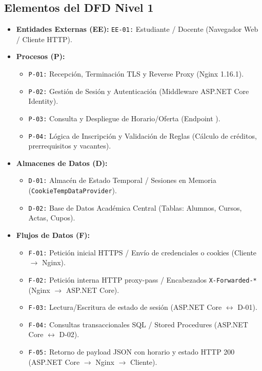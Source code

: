 \subsection{Elementos del DFD Nivel 1}
\begin{itemize}[itemsep=1.5pt,topsep=1pt,parsep=0pt]
    \item \textbf{Entidades Externas (EE):} \texttt{EE-01:} Estudiante / Docente (Navegador Web / Cliente HTTP).
    \item \textbf{Procesos (P):}
    \begin{itemize}[itemsep=0.8pt,topsep=0.5pt,parsep=0pt]
        \item \texttt{P-01:} Recepción, Terminación TLS y Reverse Proxy (Nginx 1.16.1).
        \item \texttt{P-02:} Gestión de Sesión y Autenticación (Middleware ASP.NET Core Identity).
        \item \texttt{P-03:} Consulta y Despliegue de Horario/Oferta (Endpoint ).
        \item \texttt{P-04:} Lógica de Inscripción y Validación de Reglas (Cálculo de créditos, prerrequisitos y vacantes).
    \end{itemize}
    \item \textbf{Almacenes de Datos (D):}
    \begin{itemize}[itemsep=0.8pt,topsep=0.5pt,parsep=0pt]
        \item \texttt{D-01:} Almacén de Estado Temporal / Sesiones en Memoria (\texttt{CookieTempDataProvider}).
        \item \texttt{D-02:} Base de Datos Académica Central (Tablas: Alumnos, Cursos, Actas, Cupos).
    \end{itemize}
    \item \textbf{Flujos de Datos (F):}
    \begin{itemize}[itemsep=0.8pt,topsep=0.5pt,parsep=0pt]
        \item \texttt{F-01:} Petición inicial HTTPS / Envío de credenciales o cookies (Cliente $\rightarrow$ Nginx).
        \item \texttt{F-02:} Petición interna HTTP proxy-pass / Encabezados \texttt{X-Forwarded-*} (Nginx $\rightarrow$ ASP.NET Core).
        \item \texttt{F-03:} Lectura/Escritura de estado de sesión (ASP.NET Core $\leftrightarrow$ D-01).
        \item \texttt{F-04:} Consultas transaccionales SQL / Stored Procedures (ASP.NET Core $\leftrightarrow$ D-02).
        \item \texttt{F-05:} Retorno de payload JSON con horario y estado HTTP 200 (ASP.NET Core $\rightarrow$ Nginx $\rightarrow$ Cliente).
    \end{itemize}
\end{itemize}

